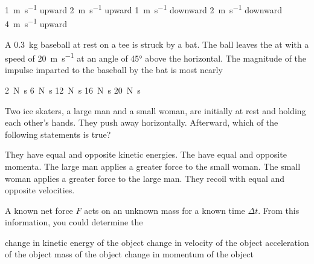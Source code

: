 \documentclass{../../../oss-ap12ibhl-print}
\begin{document}
\begin{questions}
  \begin{minipage}{.4\linewidth}
  \end{minipage}
  \begin{minipage}{.4\linewidth}
    \begin{choices}
      \choice \SI{1}{\metre\per\second} upward
      \choice \SI{2}{\metre\per\second} upward
      \choice \SI{1}{\metre\per\second} downward
      \choice \SI{2}{\metre\per\second} downward
    \choice \SI{4}{\metre\per\second} upward
    \end{choices}
  \end{minipage}
  
  \question A \SI{.3}{\kilo\gram} baseball at rest on a tee is struck by a bat.
  The ball leaves the at with a speed of \SI{20}{\metre\per\second} at an angle
  of \ang{45} above the horizontal. The magnitude of the impulse imparted to
  the baseball by the bat is most nearly
  \begin{choices}
    \choice\SI{2}{\newton\second}
    \choice\SI{6}{\newton\second}
    \choice\SI{12}{\newton\second}
    \choice\SI{16}{\newton\second}
    \choice\SI{20}{\newton\second}
  \end{choices}

  \question Two ice skaters, a large man and a small woman, are initially at
  rest and holding each other's hands. They push away horizontally. Afterward,
  which of the following statements is true?
  \begin{choices}
    \choice They have equal and opposite kinetic energies.
    \choice The have equal and opposite momenta.
    \choice The large man applies a greater force to the small woman.
    \choice The small woman applies a greater force to the large man.
    \choice They recoil with equal and opposite velocities.
  \end{choices}

  \question A known net force $F$ acts on an unknown mass for a known time
  $\Delta t$. From this information, you could determine the
  \begin{choices}
    \choice change in kinetic energy of the object
    \choice change in velocity of the object
    \choice acceleration of the object
    \choice mass of the object
    \choice change in momentum of the object
  \end{choices}


\end{questions}
\end{document}
